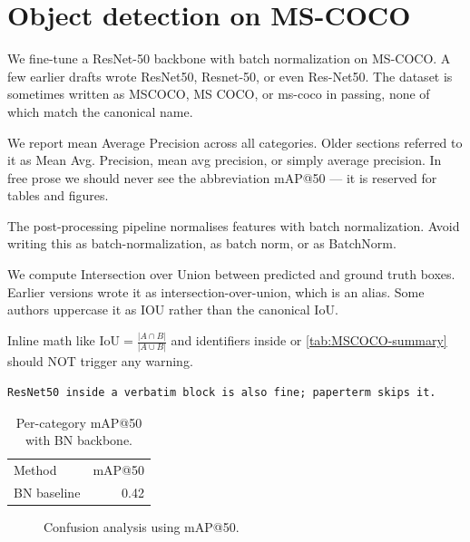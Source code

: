 \section{Object detection on MS-COCO}
\label{sec:experiments}


We fine-tune a ResNet-50 backbone with batch normalization on
MS-COCO.  A few earlier drafts wrote ResNet50, Resnet-50, or even
Res-Net50.  The dataset is sometimes written as MSCOCO, MS COCO,
or ms-coco in passing, none of which match the canonical name.

We report mean Average Precision across all categories.  Older
sections referred to it as Mean Avg. Precision, mean avg precision,
or simply average precision.  In free prose we should never see the
abbreviation mAP@50 — it is reserved for tables and figures.

The post-processing pipeline normalises features with batch
normalization.  Avoid writing this as batch-normalization, as
batch norm, or as BatchNorm.

We compute Intersection over Union between predicted and ground
truth boxes.  Earlier versions wrote it as intersection-over-union,
which is an alias.  Some authors uppercase it as IOU rather than
the canonical IoU.

Inline math like $\mathrm{IoU} = \frac{|A \cap B|}{|A \cup B|}$
and identifiers inside \cite{ResNet50:2016, MSCOCO-extended} or
\ref{tab:MSCOCO-summary} should NOT trigger any warning.

\begin{verbatim}
ResNet50 inside a verbatim block is also fine; paperterm skips it.
\end{verbatim}

\begin{table}[t]
  \centering
  \caption{Per-category mAP@50 with BN backbone.}
  \label{tab:summary}
  \begin{tabular}{lr}
    Method        & mAP@50 \\
    BN baseline   & 0.42 \\
  \end{tabular}
\end{table}

\begin{figure}[t]
  \centering
  \caption{Confusion analysis using mAP@50.}
\end{figure}
